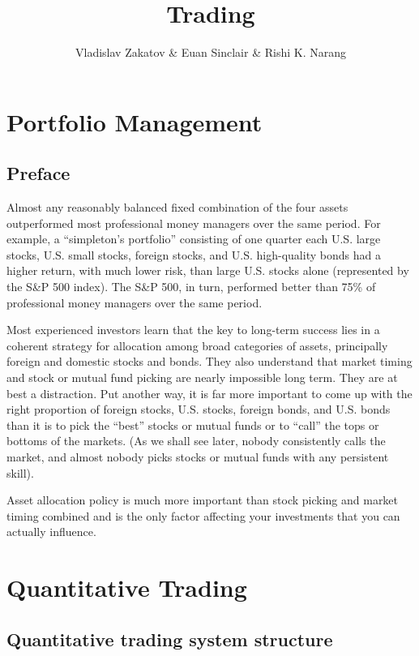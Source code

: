 \documentclass[11pt]{report}
\begin{document}
\title{Trading}
\author{Vladislav Zakatov \& Euan Sinclair \& Rishi K. Narang}
\date{}
\maketitle

\tableofcontents

\part{Portfolio Management}

	\chapter{Preface}
		Almost any reasonably balanced fixed combination of the four assets outperformed most professional money managers over the same period. For example, a ``simpleton's portfolio'' consisting of one quarter each U.S. large stocks, U.S. small stocks, foreign stocks, and U.S. high-quality bonds had a higher return, with much lower risk, than large U.S. stocks alone (represented by the S\&P 500 index). The S\&P 500, in turn, performed better than 75\% of professional money managers over the same period.

		Most experienced investors learn that the key to long-term success lies in a coherent strategy for allocation among broad categories of assets, principally foreign and domestic stocks and bonds. They also understand that market timing and stock or mutual fund picking are nearly impossible long term. They are at best a distraction. Put another way, it is far more important to come up with the right proportion of foreign stocks, U.S. stocks, foreign bonds, and U.S. bonds than it is to pick the ``best'' stocks or mutual funds or to ``call'' the tops or bottoms of the markets. (As we shall see later, nobody consistently calls the market, and almost nobody picks stocks or mutual funds with any persistent skill).

		Asset allocation policy is much more important than stock picking and market timing combined and is the only factor affecting your investments that you can actually influence.

\part{Quantitative Trading}
	
	\chapter{Quantitative trading system structure}
\end{document}
